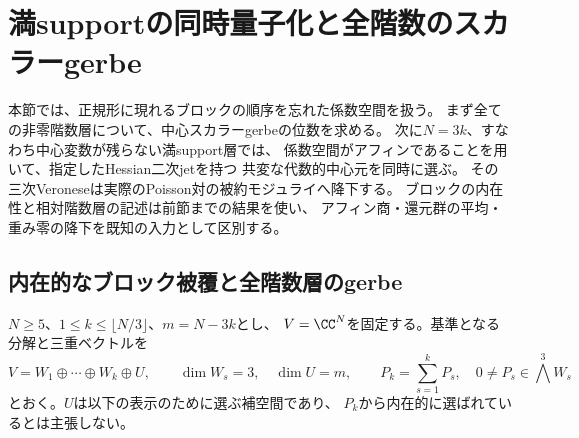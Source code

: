 \section{満supportの同時量子化と全階数のスカラーgerbe}
\label{sec:pg-full-support-quantization}

本節では、正規形に現れるブロックの順序を忘れた係数空間を扱う。
まず全ての非零階数層について、中心スカラーgerbeの位数を求める。
次に$N=3k$、すなわち中心変数が残らない満support層では、
係数空間がアフィンであることを用いて、指定したHessian二次jetを持つ
共変な代数的中心元を同時に選ぶ。
その三次Veroneseは実際のPoisson対の被約モジュライへ降下する。
ブロックの内在性と相対階数層の記述は前節までの結果を使い、
アフィン商・還元群の平均・重み零の降下を既知の入力として区別する。

\subsection{内在的なブロック被覆と全階数層のgerbe}

$N\ge5$、$1\le k\le\lfloor N/3\rfloor$、$m=N-3k$とし、
$V=\CC^N$を固定する。基準となる分解と三重ベクトルを
\begin{equation}
 V=W_1\oplus\cdots\oplus W_k\oplus U,\qquad
 \dim W_s=3,\quad\dim U=m,\qquad
 P_k=\sum_{s=1}^kP_s,\quad
 0\ne P_s\in\bigwedge^3W_s
 \label{eq:pg-intrinsic-multiblock-reference}
\end{equation}
とおく。$U$は以下の表示のために選ぶ補空間であり、
$P_k$から内在的に選ばれているとは主張しない。

